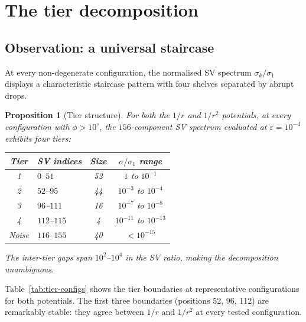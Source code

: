 \documentclass[11pt,a4paper]{article}
\newtheorem{proposition}[theorem]{Proposition}
\theoremstyle{remark}
\begin{document}
\section{The tier decomposition}
\label{sec:tiers}

\subsection{Observation: a universal staircase}

At every non-degenerate configuration, the normalised SV
spectrum $\sigma_k / \sigma_1$ displays a characteristic
staircase pattern with four shelves separated by abrupt
drops.

\begin{proposition}[Tier structure]
\label{prop:tiers}
For both the $1/r$ and $1/r^2$ potentials, at every
configuration with $\phi > 10^\circ$, the $156$-component
SV spectrum evaluated at $\varepsilon = 10^{-4}$ exhibits
four tiers:
\begin{center}
\begin{tabular}{@{}clcc@{}}
\toprule
Tier & SV indices & Size & $\sigma/\sigma_1$ range \\
\midrule
1 & $0$--$51$ & 52 & $1$ to $10^{-1}$ \\
2 & $52$--$95$ & 44 & $10^{-3}$ to $10^{-4}$ \\
3 & $96$--$111$ & 16 & $10^{-7}$ to $10^{-8}$ \\
4 & $112$--$115$ & 4 & $10^{-11}$ to $10^{-13}$ \\
\midrule
Noise & $116$--$155$ & 40 & $< 10^{-15}$ \\
\bottomrule
\end{tabular}
\end{center}
The inter-tier gaps span $10^{2}$--$10^{4}$ in the SV
ratio, making the decomposition unambiguous.
\end{proposition}

Table~\ref{tab:tier-configs} shows the tier boundaries at
representative configurations for both potentials.  The
first three boundaries (positions 52, 96, 112) are
remarkably stable: they agree between $1/r$ and $1/r^2$
at every tested configuration.
\end{document}
